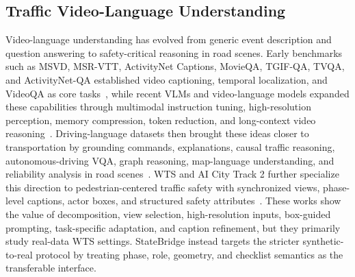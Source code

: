 \documentclass[runningheads]{llncs}
\begin{document}
\subsection{Traffic Video-Language Understanding}
Video-language understanding has evolved from generic event description and question answering to safety-critical reasoning in road scenes. Early benchmarks such as MSVD, MSR-VTT, ActivityNet Captions, MovieQA, TGIF-QA, TVQA, and ActivityNet-QA established video captioning, temporal localization, and VideoQA as core tasks~\cite{chen2011msvd,xu2016msrvtt,krishna2017dense,tapaswi2016movieqa,jang2017tgifqa,lei2018tvqa,yu2019activitynetqa}, while recent VLMs and video-language models expanded these capabilities through multimodal instruction tuning, high-resolution perception, memory compression, token reduction, and long-context video reasoning~\cite{alayrac2022flamingo,li2023blip2,dai2023instructblip,liu2023llava,qwenvl,wang2024qwen2vl,qwen2025qwen25vl,internvl,li2023videochat,maaz2023videochatgpt,zhang2023videollama,lin2023videollava,song2024moviechat,li2023llamavid,shu2024videoxl}. Driving-language datasets then brought these ideas closer to transportation by grounding commands, explanations, causal traffic reasoning, autonomous-driving VQA, graph reasoning, map-language understanding, and reliability analysis in road scenes~\cite{deruyttere2019talk2car,kim2018bddx,xu2021trafficqa,qian2024nuscenesqa,sima2024drivelm,cao2024maplm,li2025vladbench,xie2025drivebench,kong2025vlrdriver}. WTS and AI City Track 2 further specialize this direction to pedestrian-centered traffic safety with synchronized views, phase-level captions, actor boxes, and structured safety attributes~\cite{kong2024wts,wang2024aicity,xuan2024divide,shoman2024enhancing,pervaiz2025trafficvila,park2025trafficvila,wu2025trafficinternvl,phimsiri2025trafficinternvl,ha2025domainaware,kyem2025dualmodel,nguyennhu2025ster}. These works show the value of decomposition, view selection, high-resolution inputs, box-guided prompting, task-specific adaptation, and caption refinement, but they primarily study real-data WTS settings. StateBridge instead targets the stricter synthetic-to-real protocol by treating phase, role, geometry, and checklist semantics as the transferable interface.
\end{document}
